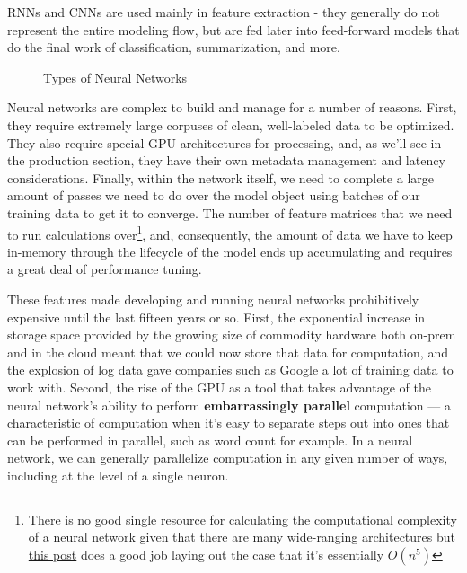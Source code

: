\documentclass[11pt, table]{diazessay} %
\begin{document}
\begin{sloppypar}
RNNs and CNNs are used mainly in feature extraction - they generally do not represent the entire modeling flow, but are fed later into feed-forward models that do the final work of classification, summarization, and more.

\begin{figure}[H]
\centering
{}
\caption{Types of Neural Networks}
\end{figure}


Neural networks are complex to build and manage for a number of reasons. First, they require extremely large corpuses of clean, well-labeled data to be optimized. They also require special GPU architectures for processing, and, as we'll see in the production section, they have their own metadata management and latency considerations. Finally, within the network itself, we need to complete a large amount of passes we need to do over the model object using batches of our training data to get it to converge. The number of feature matrices that we need to run calculations over\footnote{There is no good single resource for calculating the computational complexity of a neural network given that there are many wide-ranging architectures but   \href{https://lunalux.io/computational-complexity-of-neural-networks/}{this post} does a good job laying out the case that it's essentially $O(n^5)$}, and, consequently, the amount of data we have to keep in-memory through the lifecycle of the model ends up accumulating and requires a great deal of performance tuning.

These features made developing and running neural networks prohibitively expensive until the last fifteen years or so. First, the exponential increase in storage space provided by the growing size of commodity hardware both on-prem and in the cloud meant that we could now store that data for computation, and  the explosion of log data gave companies such as Google a lot of training data to work with.  Second,  the rise of the GPU as a tool that takes advantage of the neural network's ability to perform \textbf{embarrassingly parallel} computation --- a characteristic of computation when it's easy to separate steps out into ones that can be performed in parallel, such as word count for example. In a neural network, we can generally parallelize computation in any given number of ways, including at the level of a single neuron.  


\end{sloppypar}
\end{document}
